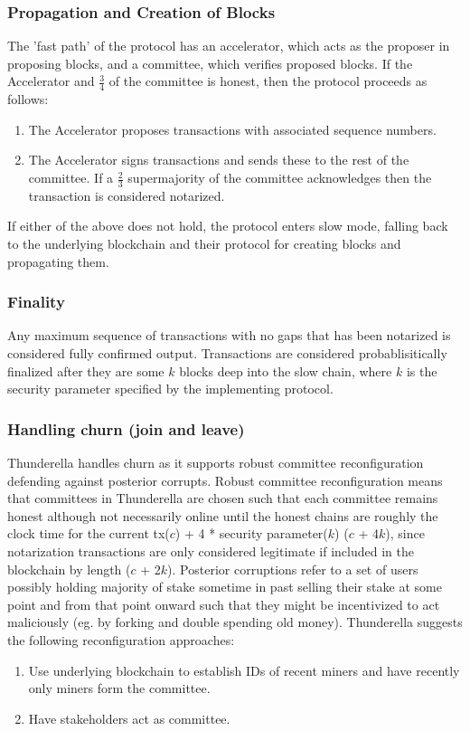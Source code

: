 \documentclass[10pt,journal,compsoc]{IEEEtran}
\begin{document}
\subsubsection{Propagation and Creation of Blocks}
The 'fast path' of the protocol has an accelerator, which acts as the proposer in proposing blocks, and a committee, which verifies proposed blocks. If the Accelerator and \(\frac{3}{4}\)  of the committee is honest, then the protocol proceeds as follows:
\begin{enumerate}
    \item The Accelerator proposes transactions with associated sequence numbers. 
    \item The Accelerator signs transactions and sends these to the rest of the committee. If a \(\frac{2}{3}\) supermajority of the committee acknowledges then the transaction is considered notarized.
\end{enumerate}
If either of the above does not hold, the protocol enters slow mode, falling back to the underlying blockchain and their protocol for creating blocks and propagating them.

\subsubsection{Finality}
Any maximum sequence of transactions with no gaps that has been notarized is considered fully confirmed output. Transactions are considered probablisitically finalized after they are some $k$ blocks deep into the slow chain, where $k$ is the security parameter specified by the implementing protocol. 

\subsubsection{Handling churn (join and leave)}
Thunderella handles churn as it supports robust committee reconfiguration defending against posterior corrupts. Robust committee reconfiguration means that committees in Thunderella are chosen such that each committee remains honest although not necessarily online until the honest chains are roughly the clock time for the current tx($c$) + 4 * security parameter($k$) ($c$ + 4$k$), since notarization transactions are only considered legitimate if included in the blockchain by length ($c$ + 2$k$). Posterior corruptions refer to a set of users possibly holding majority of stake sometime in past selling their stake at some point and from that point onward such that they might be incentivized to act maliciously (eg. by forking and double spending old money). Thunderella suggests the following reconfiguration approaches: 
\begin{enumerate}
    \item Use underlying blockchain to establish IDs of recent miners and have recently only miners form the committee. 
    \item Have stakeholders act as committee.
\end{enumerate}
\end{document}
